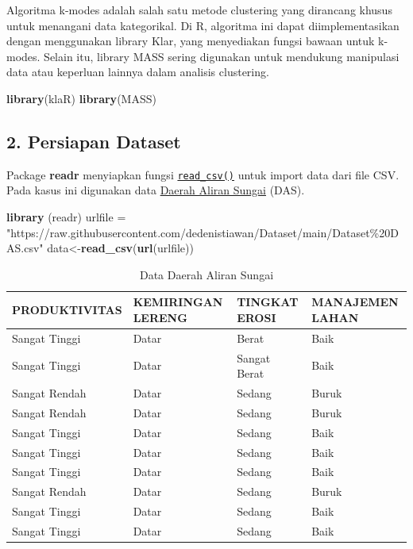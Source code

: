 \documentclass[
  oneside]{book}
\newenvironment{Shaded}{\begin{snugshade}}{\end{snugshade}}
\newcommand{\FunctionTok}[1]{\textcolor[rgb]{0.13,0.29,0.53}{\textbf{#1}}}
\newcommand{\NormalTok}[1]{#1}
\newcommand{\OtherTok}[1]{\textcolor[rgb]{0.56,0.35,0.01}{#1}}
\newcommand{\StringTok}[1]{\textcolor[rgb]{0.31,0.60,0.02}{#1}}
\begin{document}
Algoritma k-modes adalah salah satu metode clustering yang dirancang khusus untuk menangani data kategorikal. Di R, algoritma ini dapat diimplementasikan dengan menggunakan library Klar, yang menyediakan fungsi bawaan untuk k-modes. Selain itu, library MASS sering digunakan untuk mendukung manipulasi data atau keperluan lainnya dalam analisis clustering.

\begin{Shaded}
\begin{Highlighting}[]
\FunctionTok{library}\NormalTok{(klaR)}
\FunctionTok{library}\NormalTok{(MASS)}
\end{Highlighting}
\end{Shaded}

\subsection*{2. Persiapan Dataset}\label{persiapan-dataset}

Package \textbf{readr} menyiapkan fungsi \href{https://readr.tidyverse.org/reference/read_delim.html}{\texttt{read\_csv()}} untuk import data dari file CSV. Pada kasus ini digunakan data \href{https://github.com/dedenistiawan/dataset}{Daerah Aliran Sungai} (DAS).

\begin{Shaded}
\begin{Highlighting}[]
\FunctionTok{library}\NormalTok{ (readr)}
\NormalTok{urlfile }\OtherTok{=} \StringTok{"https://raw.githubusercontent.com/dedenistiawan/Dataset/main/Dataset\%20DAS.csv"}
\NormalTok{data}\OtherTok{\textless{}{-}}\FunctionTok{read\_csv}\NormalTok{(}\FunctionTok{url}\NormalTok{(urlfile))}
\end{Highlighting}
\end{Shaded}

\begin{table}

\caption{\label{tab:nice-tab-1}Data Daerah Aliran Sungai}
\centering
\begin{tabular}[t]{llll}
\toprule
PRODUKTIVITAS & KEMIRINGAN LERENG & TINGKAT EROSI & MANAJEMEN LAHAN\\
\midrule
Sangat Tinggi & Datar & Berat & Baik\\
Sangat Tinggi & Datar & Sangat Berat & Baik\\
Sangat Rendah & Datar & Sedang & Buruk\\
Sangat Rendah & Datar & Sedang & Buruk\\
Sangat Tinggi & Datar & Sedang & Baik\\
\addlinespace
Sangat Tinggi & Datar & Sedang & Baik\\
Sangat Tinggi & Datar & Sedang & Baik\\
Sangat Rendah & Datar & Sedang & Buruk\\
Sangat Tinggi & Datar & Sedang & Baik\\
Sangat Tinggi & Datar & Sedang & Baik\\
\bottomrule
\end{tabular}
\end{table}
\end{document}
